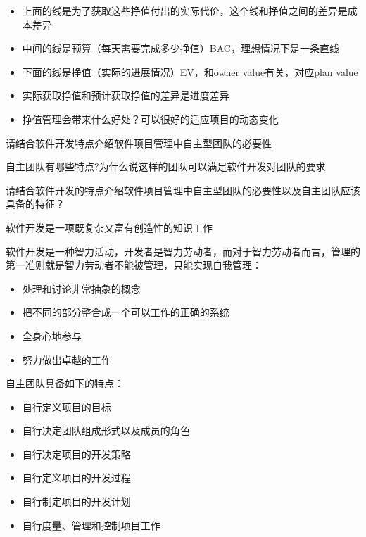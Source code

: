 \begin{solution}
\begin{itemize}
    \item 上面的线是为了获取这些挣值付出的实际代价，这个线和挣值之间的差异是成本差异
    \item 中间的线是预算（每天需要完成多少挣值）BAC，理想情况下是一条直线
    \item 下面的线是挣值（实际的进展情况）EV，和owner value有关，对应plan value
    \item 实际获取挣值和预计获取挣值的差异是进度差异
    \item 挣值管理会带来什么好处？可以很好的适应项目的动态变化
\end{itemize}
\end{solution}



\begin{problem}[2013、2014、2015、2016、2020]
请结合软件开发特点介绍软件项目管理中自主型团队的必要性

自主团队有哪些特点?为什么说这样的团队可以满足软件开发对团队的要求

请结合软件开发的特点介绍软件项目管理中自主型团队的必要性以及自主团队应该具备的特征？
\end{problem}

\begin{solution}
软件开发是一项既复杂又富有创造性的知识工作

软件开发是一种智力活动，开发者是智力劳动者，而对于智力劳动者而言，管理的第一准则就是智力劳动者不能被管理，只能实现自我管理：
\vspace{-0.8em}
\begin{multicols}{2}
    \begin{itemize}
        \item 处理和讨论非常抽象的概念
        \item 把不同的部分整合成一个可以工作的正确的系统
        \item 全身心地参与
        \item 努力做出卓越的工作
    \end{itemize}
\end{multicols}
\vspace{-1em}

自主团队具备如下的特点：
\vspace{-0.8em}
\begin{multicols}{2}
    \begin{itemize}
        \item 自行定义项目的目标
        \item 自行决定团队组成形式以及成员的角色
        \item 自行决定项目的开发策略
        \item 自行定义项目的开发过程
        \item 自行制定项目的开发计划
        \item 自行度量、管理和控制项目工作
    \end{itemize}
\end{multicols}
\vspace{-1em}
\end{solution}



